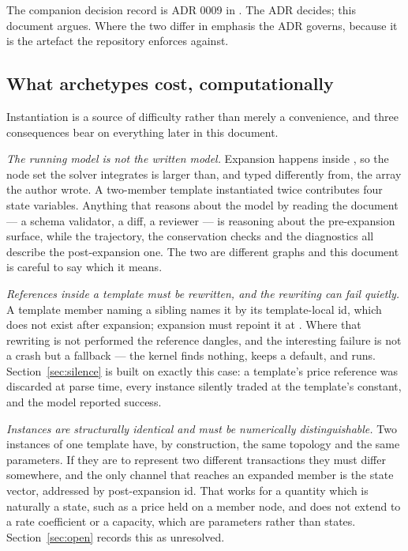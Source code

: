 \documentclass[11pt,a4paper]{article}
\begin{document}
The companion decision record is ADR 0009 in . The ADR decides; this document argues. Where the two differ in emphasis the ADR governs, because it is the artefact the repository enforces against.

\subsection{What archetypes cost, computationally}

Instantiation is a source of difficulty rather than merely a convenience, and three consequences bear on everything later in this document.

\emph{The running model is not the written model.} Expansion happens inside , so the node set the solver integrates is larger than, and typed differently from, the  array the author wrote. A two-member template instantiated twice contributes four state variables. Anything that reasons about the model by reading the document --- a schema validator, a diff, a reviewer --- is reasoning about the pre-expansion surface, while the trajectory, the conservation checks and the diagnostics all describe the post-expansion one. The two are different graphs and this document is careful to say which it means.

\emph{References inside a template must be rewritten, and the rewriting can fail quietly.} A template member naming a sibling names it by its template-local id, which does not exist after expansion; expansion must repoint it at . Where that rewriting is not performed the reference dangles, and the interesting failure is not a crash but a fallback --- the kernel finds nothing, keeps a default, and runs. Section~\ref{sec:silence} is built on exactly this case: a template's price reference was discarded at parse time, every instance silently traded at the template's constant, and the model reported success.

\emph{Instances are structurally identical and must be numerically distinguishable.} Two instances of one template have, by construction, the same topology and the same parameters. If they are to represent two different transactions they must differ somewhere, and the only channel that reaches an expanded member is the state vector, addressed by post-expansion id. That works for a quantity which is naturally a state, such as a price held on a member node, and does not extend to a rate coefficient or a capacity, which are parameters rather than states. Section~\ref{sec:open} records this as unresolved.
\end{document}
